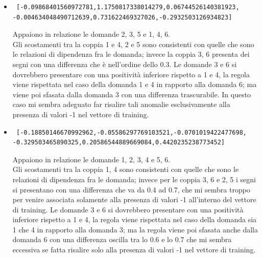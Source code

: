 \begin{itemize}
\item \begin{verbatim} [-0.09868401560972781,1.1750817338014279,0.06744526140381923,
-0.004634048490712639,0.731622469327026,-0.2932503126934823]
\end{verbatim}
Appaiono in relazione le domande 2, 3, 5  e 1, 4, 6.\\
Gli scostamenti tra la coppia 1 e 4, 2 e 5 sono consistenti con quelle che sono le relazioni di dipendenza fra le domanda; invece la coppia 3, 6 presenta dei segni con una differenza che \`e nell'ordine dello 0.3.
Le domande 3 e 6 si dovrebbero presentare con una positivit\`a inferiore rispetto a 1 e 4, la regola viene rispettata nel caso della domanda 1 e 4 in rapporto alla domanda 6; ma  viene poi sfasata dalla domanda 3 con una differenza trascurabile. In questo caso  mi sembra adeguato far risalire tali anomalie esclusivamente alla presenza di valori -1 nel vettore di training. 


\item \begin{verbatim} [-0.18850146670992962,-0.05586297769103521,-0.0701019422477698,
-0.329503465890325,0.20586544889669084,0.4420235238773452]
\end{verbatim}
Appaiono in relazione le domande 1, 2, 3, 4  e 5, 6.\\
Gli scostamenti tra la coppia 1, 4 sono consistenti con quelle che sono le relazioni di dipendenza fra le domanda; invece per le coppia 3, 6 e 2, 5 i segni si presentano con una differenza che va da 0.4 ad 0.7, che mi sembra troppo per venire associata solamente alla presenza di valori -1 all'interno del vettore di training.
Le domande 3 e 6 si dovrebbero presentare con una positivit\`a inferiore rispetto a 1 e 4, la regola viene rispettata nel caso della domanda sia 1 che 4 in rapporto alla domanda 3; ma la regola viene poi sfasata anche dalla domanda 6 con una differenza oscilla tra lo 0.6 e lo 0.7 che mi sembra eccessiva se fatta risalire solo alla presenza di valori -1 nel vettore di training.
\end{itemize}

